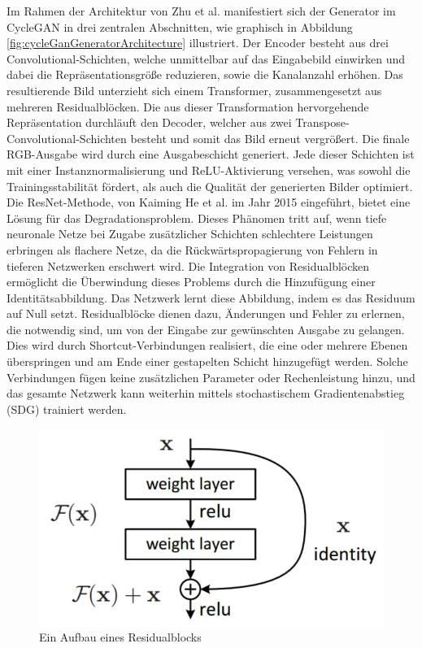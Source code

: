 Im Rahmen der Architektur von Zhu et al. manifestiert sich der Generator im CycleGAN in drei zentralen Abschnitten, wie graphisch in Abbildung \ref{fig:cycleGanGeneratorArchitecture} illustriert. Der Encoder besteht aus drei Convolutional-Schichten, welche unmittelbar auf das Eingabebild einwirken und dabei die Repräsentationsgröße reduzieren, sowie die Kanalanzahl erhöhen. Das resultierende Bild unterzieht sich einem Transformer, zusammengesetzt aus mehreren Residualblöcken. Die aus dieser Transformation hervorgehende Repräsentation durchläuft den Decoder, welcher aus zwei Transpose-Convolutional-Schichten besteht und somit das Bild erneut vergrößert. Die finale RGB-Ausgabe wird durch eine Ausgabeschicht generiert. Jede dieser Schichten ist mit einer Instanznormalisierung und ReLU-Aktivierung versehen, was sowohl die Trainingsstabilität fördert, als auch die Qualität der generierten Bilder optimiert\cite{Ulyanov.2016,Nair.2010}. 
\\
\newline
Die ResNet-Methode, von Kaiming He et al. im Jahr 2015 eingeführt, bietet eine Lösung für das Degradationsproblem. Dieses Phänomen tritt auf, wenn tiefe neuronale Netze bei Zugabe zusätzlicher Schichten schlechtere Leistungen erbringen als flachere Netze, da die Rückwärtspropagierung von Fehlern in tieferen Netzwerken erschwert wird. Die Integration von Residualblöcken ermöglicht die Überwindung dieses Problems durch die Hinzufügung einer Identitätsabbildung. Das Netzwerk lernt diese Abbildung, indem es das Residuum auf Null setzt. Residualblöcke dienen dazu, Änderungen und Fehler zu erlernen, die notwendig sind, um von der Eingabe zur gewünschten Ausgabe zu gelangen. Dies wird durch Shortcut-Verbindungen realisiert, die eine oder mehrere Ebenen überspringen und am Ende einer gestapelten Schicht hinzugefügt werden. Solche Verbindungen fügen keine zusätzlichen Parameter oder Rechenleistung hinzu, und das gesamte Netzwerk kann weiterhin mittels stochastischem Gradientenabstieg (SDG) trainiert werden\cite{He.2015}.

\begin{figure}[ht]
	\centering
	\includegraphics[width=0.5\linewidth]{./images/residualBlock.png}
	\caption{Ein Aufbau eines Residualblocks}
	\label{fig:residualBlock}
\end{figure}

